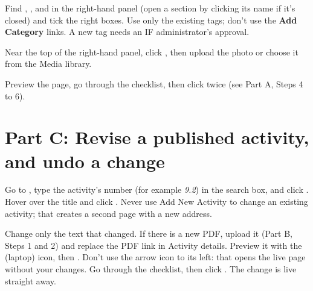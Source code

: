 Find , , and  in the right-hand panel (open a section by clicking its name if it's closed) and tick the right boxes. Use only the existing tags; don't use the \textbf{Add Category} links. A new tag needs an IF administrator's approval.

Near the top of the right-hand panel, click , then upload the photo or choose it from the Media library.

{\raggedright Preview the page, go through the checklist, then click  twice (see Part A, Steps 4 to 6).\par}

\newpage
\section*{Part C: Revise a published activity, and undo a change}
\setcounter{wstep}{0}

Go to , type the activity's number (for example \textit{9.2}) in the search box, and click . Hover over the title and click . Never use Add New Activity to change an existing activity; that creates a second page with a new address.

Change only the text that changed. If there is a new PDF, upload it (Part B, Steps 1 and 2) and replace the PDF link in Activity details. Preview it with the  (laptop) icon, then . Don't use the arrow icon to its left: that opens the live page without your changes. Go through the checklist, then click . The change is live straight away.

